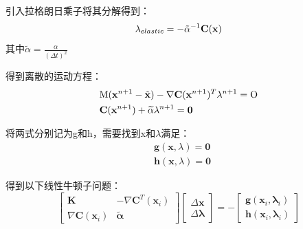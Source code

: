 \documentclass{CLGPY}
\begin{document}
\begin{multicols}{2}
		引入拉格朗日乘子将其分解得到：
       \begin{equation}
			\lambda_{e l a s t i c}=-\tilde{\alpha}^{-1}{\bf C}({\bf x})
		\end{equation}
		其中$\widetilde{\alpha}=\frac{\alpha}{(\Delta t)^2}$

		得到离散的运动方程：
		\begin{equation}
		\begin{split}
			&\mathrm{M}({\bf x}^{n+1}-\tilde{\bf x})-\nabla{\bf C}({\bf x}^{n+1})^{T}\lambda^{n+1}=\mathrm{O}\\ 
			&{\mathbf C}({\mathbf x}^{n+1})+\widetilde{\alpha}\lambda^{n+1}={\mathbf0}
		\end{split}
		\end{equation}

		将两式分别记为g和h，需要找到x和$\lambda$满足：
		\begin{equation}
		\begin{split}
			&\mathbf{g}(\mathbf{x},\lambda)=\mathbf{0}\\ 
			&\mathbf{h}(\mathbf{x},\lambda)=\mathbf{0}
		\end{split}
		\end{equation}

		得到以下线性牛顿子问题：
		\begin{equation}
		\left[\begin{array}{cc}
		\mathbf{K} & -\nabla \mathbf{C}^{T}\left(\mathbf{x}_{i}\right) \\
		\nabla \mathbf{C}\left(\mathbf{x}_{i}\right) & \tilde{\boldsymbol{\alpha}}
		\end{array}\right]\left[\begin{array}{l}
		\Delta \mathbf{x} \\
		\Delta \boldsymbol{\lambda}
		\end{array}\right]=-\left[\begin{array}{l}
		\mathbf{g}\left(\mathbf{x}_{i}, \boldsymbol{\lambda}_{i}\right) \\
		\mathbf{h}\left(\mathbf{x}_{i}, \boldsymbol{\lambda}_{i}\right)
		\end{array}\right]
		\end{equation}


\end{multicols}
\end{document}

